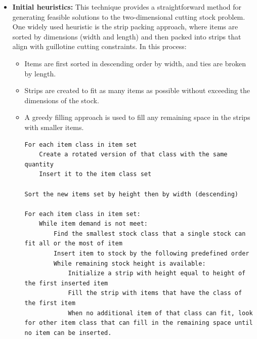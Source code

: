 \documentclass[a4paper]{article}
\begin{document}
\begin{itemize}
    \item \textbf{Initial heuristics:} This technique provides a straightforward method for generating feasible solutions to the two-dimensional cutting stock problem. One widely used heuristic is the strip packing approach, where items are sorted by dimensions (width and length) and then packed into strips that align with guillotine cutting constraints. In this process:
\begin{itemize}     
    \item Items are first sorted in descending order by width, and ties are broken by length.     
    \item Strips are created to fit as many items as possible without exceeding the dimensions of the stock.      
    \item A greedy filling approach is used to fill any remaining space in the strips with smaller items. 
        
\begin{verbatim}
For each item class in item set
	Create a rotated version of that class with the same quantity
	Insert it to the item class set

Sort the new items set by height then by width (descending)

For each item class in item set:
	While item demand is not meet:
		Find the smallest stock class that a single stock can fit all or the most of item
		Insert item to stock by the following predefined order
		While remaining stock height is available:
			Initialize a strip with height equal to height of the first inserted item
			Fill the strip with items that have the class of the first item
			When no additional item of that class can fit, look for other item class that can fill in the remaining space until no item can be inserted.
\end{verbatim}
\end{itemize}


\end{itemize}
\end{document}
